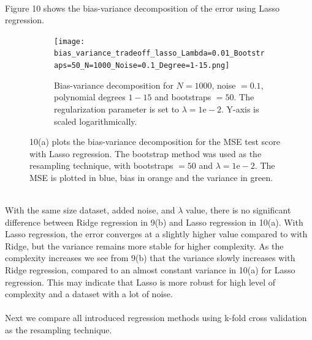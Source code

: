 \documentclass[a4paper,twocolumn]{article}
\begin{document}
\\
Figure 10 shows the bias-variance decomposition of the error using Lasso regression. 
\begin{figure}[ht]
    \centering
    \begin{subfigure}[b]{0.9\columnwidth}
        \texttt{[image: bias\_variance\_tradeoff\_lasso\_Lambda=0.01\_Bootstraps=50\_N=1000\_Noise=0.1\_Degree=1-15.png]}
        \caption{Bias-variance decomposition for $N = 1000$, noise $= 0.1$, polynomial degrees $1- 15$ and bootstraps $= 50$. The regularization parameter is set to $\lambda = 1\textrm{e}-2$. Y-axis is scaled logarithmically.}
    \end{subfigure}
    \caption{10(a) plots the bias-variance decomposition for the MSE test score with Lasso regression. The bootstrap method was used as the resampling technique, with bootstraps $= 50$ and $\lambda = 1\textrm{e}-2$. The MSE is plotted in blue, bias in orange and the variance in green. }
\end{figure}\\
With the same size dataset, added noise, and $\lambda$ value, there is no significant difference between Ridge regression in 9(b) and Lasso regression in 10(a). With Lasso regression, the error converges at a slightly higher value compared to with Ridge, but the variance remains more stable for higher complexity. As the complexity increases we see from 9(b) that the variance slowly increases with Ridge regression, compared to an almost constant variance in 10(a) for Lasso regression. This may indicate that Lasso is more robust for high level of complexity and a dataset with a lot of noise.\\
\\
Next we compare all introduced regression methods using k-fold cross validation as the resampling technique.
\end{document}
